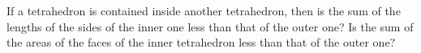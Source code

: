 If a tetrahedron is contained inside another tetrahedron,
then is the sum of the lengths of the sides of the inner one less than that of the outer one?
Is the sum of the areas of the faces of the inner tetrahedron less than that of the outer one?
